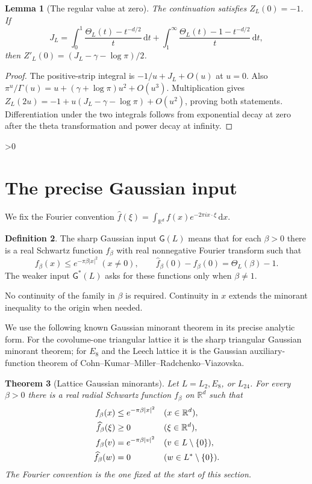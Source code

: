 \documentclass[11pt,a4paper]{article}
\newtheorem{theorem}{Theorem}[section]
\newtheorem{lemma}[theorem]{Lemma}
\theoremstyle{definition}
\newtheorem{definition}[theorem]{Definition}
\newcommand{\R}{\mathbb R}
\newcommand{\dd}{\,\mathrm d}
\newcommand{\abs}[1]{\lvert#1\rvert}
\newcommand{\G}{\mathsf G}
\numberwithin{equation}{section}
\let\originalsection\section
\renewcommand{\section}{\ifnum\value{section}>0\clearpage\fi\originalsection}
\begin{document}
\begin{lemma}[The regular value at zero]\label{lem:zetazero}
The continuation satisfies $Z_L(0)=-1$. If
\begin{equation}
 J_L=\int_0^1\frac{\Theta_L(t)-t^{-d/2}}t\dd t+
      \int_1^\infty\frac{\Theta_L(t)-1-t^{-d/2}}t\dd t,
\end{equation}
then $Z'_L(0)=(J_L-\gamma-\log\pi)/2$.
\end{lemma}
\begin{proof}
The positive-strip integral is $-1/u+J_L+O(u)$ at $u=0$. Also $\pi^u/\Gamma(u)=u+(\gamma+\log\pi)u^2+O(u^3)$. Multiplication gives $Z_L(2u)=-1+u(J_L-\gamma-\log\pi)+O(u^2)$, proving both statements. Differentiation under the two integrals follows from exponential decay at zero after the theta transformation and power decay at infinity.
\end{proof}

\section{The precise Gaussian input}\label{sec:input}
We fix the Fourier convention $\widehat f(\xi)=\int_{\R^d}f(x)e^{-2\pi i x\cdot\xi}\dd x$.

\begin{definition}\label{def:G}
The sharp Gaussian input $\G(L)$ means that for each $\beta>0$ there is a real Schwartz function $f_\beta$ with real nonnegative Fourier transform such that
\begin{equation}\label{eq:input}
 f_\beta(x)\le e^{-\pi\beta\abs x^2}\ (x\ne0),\qquad
 \widehat f_\beta(0)-f_\beta(0)=\Theta_L(\beta)-1.
\end{equation}
The weaker input $\G^*(L)$ asks for these functions only when $\beta\ne1$.
\end{definition}
No continuity of the family in $\beta$ is required. Continuity in $x$ extends the minorant inequality to the origin when needed.

We use the following known Gaussian minorant theorem in its precise analytic form. For the covolume-one triangular lattice it is the sharp triangular Gaussian minorant theorem; for $E_8$ and the Leech lattice it is the Gaussian auxiliary-function theorem of Cohn--Kumar--Miller--Radchenko--Viazovska.

\begin{theorem}[Lattice Gaussian minorants]\label{thm:lattice-gaussian}
Let $L=L_2,E_8$, or $L_{24}$. For every $\beta>0$ there is a real radial Schwartz function $f_\beta$ on $\R^d$ such that
\begin{align}
 f_\beta(x)&\le e^{-\pi\beta\abs x^2}&& (x\in\R^d),\notag\\
 \widehat f_\beta(\xi)&\ge0&& (\xi\in\R^d),\label{eq:lattice-minorant-theorem}\\
 f_\beta(v)&=e^{-\pi\beta\abs v^2}&& (v\in L\setminus\{0\}),\notag\\
 \widehat f_\beta(w)&=0&& (w\in L^*\setminus\{0\}).\notag
\end{align}
The Fourier convention is the one fixed at the start of this section.
\end{theorem}
\end{document}

